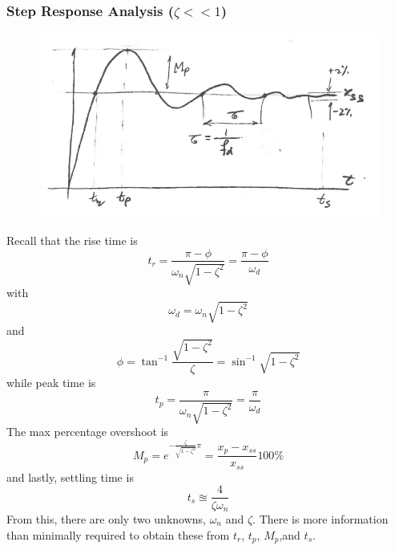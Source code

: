 \documentclass[12pt,letter]{article}
\numberwithin{ex}{section} %
\numberwithin{re}{section} %
\numberwithin{equation}{section}	%
\begin{document}
\subsubsection{Step Response Analysis ($\zeta << 1$)}
			\begin{figure}[H]
				\centering
				\includegraphics[width=5in]{../figures/system_identification_step_response.png}
			\end{figure}

Recall that the rise time is
\begin{equation}
t_r = \frac{\pi - \phi}{\omega_n \sqrt{1-\zeta^2}} = \frac{\pi - \phi}{\omega_d}
\end{equation}
with
\begin{equation}
\omega_d = \omega_n \sqrt{1-\zeta^2}
\end{equation}
and
\begin{equation}
\phi = \tan^{-1} \frac{\sqrt{1-\zeta^2}}{\zeta} = \sin^{-1} \sqrt{1-\zeta^2}
\end{equation}
while peak time is
\begin{equation}
t_p = \frac{\pi}{\omega_n \sqrt{1-\zeta^2}} = \frac{\pi}{\omega_d}
\end{equation}
The max percentage overshoot is
\begin{equation}
M_p  = e^{- \frac{\zeta}{\sqrt{1-\zeta^2}} \pi }= \frac{x_p - x_{ss}}{x_{ss}} 100\%
\end{equation}
and lastly, settling time is
\begin{equation}
t_s \approxeq \frac{4}{\zeta \omega_n}
\end{equation}
From this, there are only two unknowns, $\omega_n$ and $\zeta$. There is more information than minimally required to obtain these from $t_r$, $t_p$, $M_p$,and $t_s$.
\end{document}
